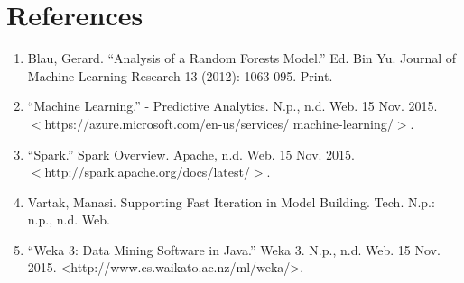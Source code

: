 \documentclass[../proposal.tex]{subfiles}
\begin{document}
\section{References}

\begin{enumerate}[topsep=0pt,itemsep=-1ex,partopsep=1ex,parsep=1ex]

\item Blau, Gerard. ``Analysis of a Random Forests Model.'' Ed. Bin Yu. Journal of Machine Learning Research 13 (2012): 1063-095. Print.

\item ``Machine Learning.'' - Predictive Analytics. N.p., n.d. Web. 15 Nov. 2015. \\
$<$https://azure.microsoft.com/en-us/services/ machine-learning/$>$.

\item ``Spark.'' Spark Overview. Apache, n.d. Web. 15 Nov. 2015. \\
$<$http://spark.apache.org/docs/latest/$>$.

\item Vartak, Manasi. Supporting Fast Iteration in Model Building. Tech. N.p.: n.p.,
n.d. Web.

\item ``Weka 3: Data Mining Software in Java.'' Weka 3. N.p., n.d. Web. 15 Nov. 2015.
<http://www.cs.waikato.ac.nz/ml/weka/>.

\end{enumerate}
\end{document}
